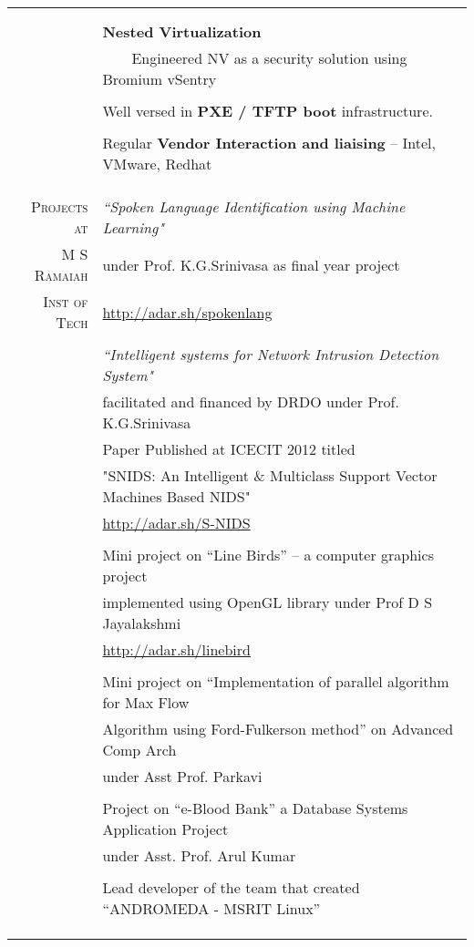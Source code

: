 \documentclass[a4paper,10pt]{article} %
\newcommand{\tabitem}{~~\llap{\textbullet}~~}
\begin{document}
\begin{tabular}{rl}
& \\
&\\
& \textbf{Nested Virtualization} \\
& \tabitem Engineered NV as a security solution using Bromium vSentry \\
& \\
& Well versed in \textbf{PXE / TFTP boot} infrastructure. \\
& \\
& Regular \textbf{Vendor Interaction and liaising} – Intel, VMware, Redhat \\
&\\
&\\
&\\
\textsc{Projects at} & \textit{“Spoken Language Identification using Machine Learning"}\\ 
\textsc{M S Ramaiah} & under Prof. K.G.Srinivasa as final year project\\
\textsc{Inst of Tech} & \href{http://adar.sh/spokenlang}{http://adar.sh/spokenlang}\\
& \\
& \textit{“Intelligent systems for Network Intrusion Detection System"} \\ 
& facilitated and financed by DRDO under Prof. K.G.Srinivasa\\
& Paper Published at ICECIT 2012 titled \\
& "SNIDS: An Intelligent \& Multiclass Support Vector Machines Based NIDS" \\
& \href{http://adar.sh/S-NIDS}{http://adar.sh/S-NIDS} \\
& \\
& Mini project on “Line Birds” – a computer graphics project \\
& implemented using OpenGL library under Prof D S Jayalakshmi \\
& \href{http://adar.sh/linebird}{http://adar.sh/linebird}\\
& \\
& Mini project on “Implementation of parallel algorithm for Max Flow \\
& Algorithm using Ford-Fulkerson method” on Advanced Comp Arch \\
& under Asst Prof. Parkavi \\
& \\
& Project on “e-Blood Bank” a Database Systems Application Project \\
& under Asst. Prof. Arul Kumar \\
& \\
& Lead developer of the team that created “ANDROMEDA - MSRIT Linux” \\
& \\
& \\
& \\
\end{tabular}
\end{document}

